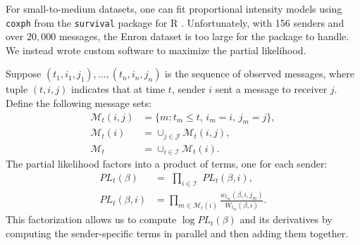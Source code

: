 \documentclass[aoas,preprint]{imsart}
\begin{document}
For small-to-medium datasets, one can fit proportional intensity models
using \texttt{coxph} from the \texttt{survival} package for R
\cite{therneau2009survival}.  Unfortunately, with 156 senders and
over $20,000$ messages, the Enron dataset is too large for the package
to handle.  We instead wrote custom software to maximize the partial
likelihood.

Suppose $(t_1, i_1, j_1), \ldots, (t_n, i_n, j_n)$ is the sequence of observed
messages, where tuple $(t,i,j)$ indicates that at time $t$, sender $i$ sent a
message to receiver $j$.  Define the following message sets:
\begin{align*}
  \mathcal{M}_t(i,j)
    &= \{ m : t_m \leq t, \, i_m = i, \, j_m = j \}, \\
  \mathcal{M}_t(i)
    &= \cup_{j \in \mathcal{J}} \mathcal{M}_t(i,j), \\
  \mathcal{M}_t
    &= \cup_{i \in \mathcal{I}} \mathcal{M}_t(i).
\end{align*}
The partial likelihood factors into a product of terms, one for each sender:
\begin{align*}
    \mathit{PL}_t(\beta)
        &=
        \,\,
        \prod_{i \in \mathcal{I}}
            \,\,
            \mathit{PL}_t(\beta, i), \\
    \mathit{PL}_t(\beta, i)
        &=
        \!\!\!\!
        \prod_{m \in \mathcal{M}_t(i)}
            \!\!\!
            \frac{w_{t_m} (\beta, i, j_m)}
                 {W_{t_m}(\beta, i)}.
\end{align*}
This factorization allows us to compute $\log \mathit{PL}_t(\beta)$ and
its derivatives by computing the sender-specific terms in parallel and
then adding them together.
\end{document}
